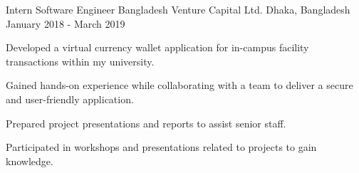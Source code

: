 
\begin{cventries}

    \cventry
        {Intern Software Engineer}
        {Bangladesh Venture Capital Ltd.}
        {Dhaka, Bangladesh}
        {January 2018 - March 2019}
        {
            \begin{cvitems}
                \item {Developed a virtual currency wallet application for in-campus facility transactions within my university.}
                \item {Gained hands-on experience while collaborating with a team to deliver a secure and user-friendly application.}
                \item {Prepared project presentations and reports to assist senior staff.}
                \item {Participated in workshops and presentations related to projects to gain knowledge.}
            \end{cvitems}
        }

\end{cventries}
